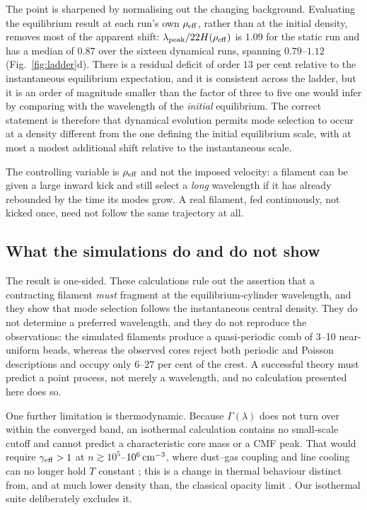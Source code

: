 \documentclass[usenatbib,twoside,twocolumn]{mnras}
\begin{document}
The point is sharpened by normalising out the changing background. Evaluating the equilibrium result at each run's own $\rho_{\rm eff}$, rather than at the initial density, removes most of the apparent shift: $\lambda_{\rm peak}/22H(\rho_{\rm eff})$ is $1.09$ for the static run and has a median of $0.87$ over the sixteen dynamical runs, spanning $0.79$--$1.12$ (Fig.~\ref{fig:ladder}d). There is a residual deficit of order $13$ per cent relative to the instantaneous equilibrium expectation, and it is consistent across the ladder, but it is an order of magnitude smaller than the factor of three to five one would infer by comparing with the wavelength of the \emph{initial} equilibrium. The correct statement is therefore that dynamical evolution permits mode selection to occur at a density different from the one defining the initial equilibrium scale, with at most a modest additional shift relative to the instantaneous scale.

The controlling variable is $\rho_{\rm eff}$ and not the imposed velocity: a filament can be given a large inward kick and still select a \emph{long} wavelength if it has already rebounded by the time its modes grow. A real filament, fed continuously, not kicked once, need not follow the same trajectory at all.

\subsection{What the simulations do and do not show}
\label{sec:simsummary}

The result is one-sided. These calculations rule out the assertion that a contracting filament \emph{must} fragment at the equilibrium-cylinder wavelength, and they show that mode selection follows the instantaneous central density. They do not determine a preferred wavelength, and they do not reproduce the observations: the simulated filaments produce a quasi-periodic comb of 3--10 near-uniform beads, whereas the observed cores reject both periodic and Poisson descriptions and occupy only $6$--$27$ per cent of the crest. A successful theory must predict a point process, not merely a wavelength, and no calculation presented here does so.

One further limitation is thermodynamic. Because $\Gamma(\lambda)$ does not turn over within the converged band, an isothermal calculation contains no small-scale cutoff and cannot predict a characteristic core mass or a CMF peak. That would require $\gamma_{\rm eff}>1$ at $n\gtrsim10^{5}$--$10^{6}\,{\rm cm^{-3}}$, where dust--gas coupling and line cooling can no longer hold $T$ constant \citep{Larson1985,Glover2012}; this is a change in thermal behaviour distinct from, and at much lower density than, the classical opacity limit \citep{Rees1976,LowLyndenBell1976}. Our isothermal suite deliberately excludes it.
\end{document}
